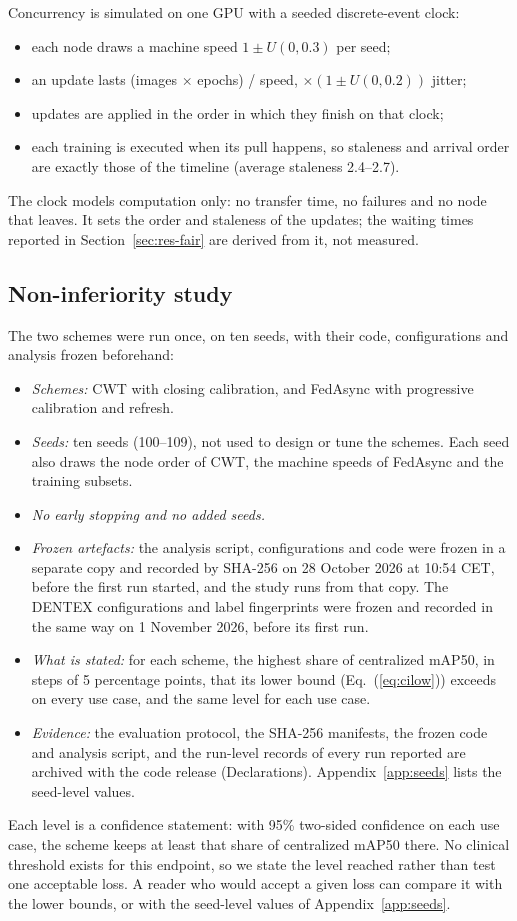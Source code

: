 \documentclass[pdflatex,sn-mathphys-num]{sn-jnl}
\begin{document}
Concurrency is simulated on one GPU with a seeded discrete-event clock:
\begin{itemize}
\item each node draws a machine speed $1\pm U(0,0.3)$ per seed;
\item an update lasts (images $\times$ epochs) / speed, $\times(1\pm U(0,0.2))$ jitter;
\item updates are applied in the order in which they finish on that clock;
\item each training is executed when its pull happens, so staleness and arrival order are exactly those of the timeline (average staleness 2.4--2.7).
\end{itemize}
The clock models computation only: no transfer time, no failures and no node that leaves. It sets the order and staleness of the updates; the waiting times reported in Section~\ref{sec:res-fair} are derived from it, not measured.

\subsection{Non-inferiority study}\label{sec:protocols}\label{sec:confirm}
The two schemes were run once, on ten seeds, with their code, configurations and analysis frozen beforehand:
\begin{itemize}
\item \emph{Schemes:} CWT with closing calibration, and FedAsync with progressive calibration and refresh.
\item \emph{Seeds:} ten seeds (100--109), not used to design or tune the schemes. Each seed also draws the node order of CWT, the machine speeds of FedAsync and the training subsets.
\item \emph{No early stopping and no added seeds.}
\item \emph{Frozen artefacts:} the analysis script, configurations and code were frozen in a separate copy and recorded by SHA-256 on 28 October 2026 at 10:54 CET, before the first run started, and the study runs from that copy. The DENTEX configurations and label fingerprints were frozen and recorded in the same way on 1 November 2026, before its first run.
\item \emph{What is stated:} for each scheme, the highest share of centralized mAP50, in steps of 5 percentage points, that its lower bound (Eq.~(\ref{eq:cilow})) exceeds on every use case, and the same level for each use case.
\item \emph{Evidence:} the evaluation protocol, the SHA-256 manifests, the frozen code and analysis script, and the run-level records of every run reported are archived with the code release (Declarations). Appendix~\ref{app:seeds} lists the seed-level values.
\end{itemize}
Each level is a confidence statement: with 95\% two-sided confidence on each use case, the scheme keeps at least that share of centralized mAP50 there. No clinical threshold exists for this endpoint, so we state the level reached rather than test one acceptable loss. A reader who would accept a given loss can compare it with the lower bounds, or with the seed-level values of Appendix~\ref{app:seeds}.
\end{document}
